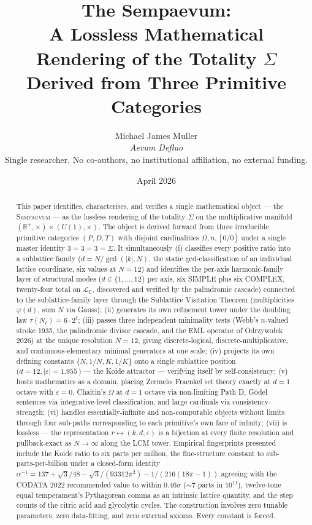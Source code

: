\documentclass[11pt,a4paper]{article}
\title{\bfseries The Sempaevum:\\[2pt]
A Lossless Mathematical Rendering of the Totality $\Sigma$\\[2pt]
Derived from Three Primitive Categories}
\author{Michael James Muller\\
\small\textit{Aevum Defluo}\\[2pt]
\small Single researcher. No co-authors, no institutional affiliation, no external funding.}
\date{April 2026}
\theoremstyle{definition}
\theoremstyle{remark}
\newcommand{\R}{\mathbb{R}}
\newcommand{\C}{\mathbb{C}}
\newcommand{\Sempaevum}{\textsc{Sempaevum}}
\begin{document}
\maketitle

\begin{abstract}
\noindent
This paper identifies, characterises, and verifies a single mathematical object — the \Sempaevum{} — as the lossless rendering of the totality $\Sigma$ on the multiplicative manifold $(\R^{+},\times) \times (U(1),\times)$. The object is derived forward from three irreducible primitive categories $(P,D,T)$ with disjoint cardinalities $\Omega, n, [0/0]$ under a single master identity $3=3=3=\Sigma$. It simultaneously (i) classifies every positive ratio into a sublattice family ($d = N/\gcd(|k|,N)$, the static gcd-classification of an individual lattice coordinate, six values at $N=12$) and identifies the per-axis harmonic-family layer of structural modes ($d \in \{1,\ldots,12\}$ per axis, six SIMPLE plus six COMPLEX, twenty-four total on $\mathcal{L}_{\C}$, discovered and verified by the palindromic cascade) connected to the sublattice-family layer through the Sublattice Visitation Theorem (multiplicities $\varphi(d)$, sum $N$ via Gauss); (ii) generates its own refinement tower under the doubling law $\tau(N_{\ell}) = 6 \cdot 2^{\ell}$; (iii) passes three independent minimality tests (Webb's $n$-valued stroke 1935, the palindromic divisor cascade, and the EML operator of Odrzywołek 2026) at the unique resolution $N=12$, giving discrete-logical, discrete-multiplicative, and continuous-elementary minimal generators at one scale; (iv) projects its own defining constants $\{N, 1/N, K, 1/K\}$ onto a single sublattice position $(d=12, |\varepsilon|=1.955$\,\textcent$)$ — the Koide attractor — verifying itself by self-consistency; (v) hosts mathematics as a domain, placing Zermelo--Fraenkel set theory exactly at $d=1$ octave with $\varepsilon=0$, Chaitin's $\Omega$ at $d=1$ octave via non-limiting Path D, Gödel sentences via integrative-level classification, and large cardinals via consistency-strength; (vi) handles essentially-infinite and non-computable objects without limits through four sub-paths corresponding to each primitive's own face of infinity; (vii) is lossless — the representation $r \mapsto (k,d,\varepsilon)$ is a bijection at every finite resolution and pullback-exact as $N \to \infty$ along the LCM tower. Empirical fingerprints presented include the Koide ratio to six parts per million, the fine-structure constant to sub-parts-per-billion under a closed-form identity $\alpha^{-1} = 137 + \sqrt{3}/48 - \sqrt{3}/(93312\pi^{2}) - 1/(216(18\pi-1))$ agreeing with the CODATA 2022 recommended value to within $0.46\sigma$ ($\sim 7$ parts in $10^{11}$), twelve-tone equal temperament's Pythagorean comma as an intrinsic lattice quantity, and the step counts of the citric acid and glycolytic cycles. The construction involves zero tunable parameters, zero data-fitting, and zero external axioms. Every constant is forced.
\end{abstract}
\end{document}
